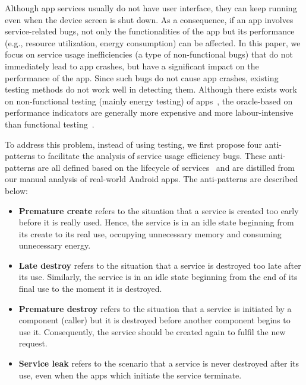 \documentclass[sigconf,review, anonymous]{acmart}
\begin{document}
Although app services usually do not have user interface, they can keep running
even when the device screen is shut down. As a consequence, if an app involves
service-related bugs, not only the functionalities of the app but its
performance (e.g., resource utilization, energy consumption) can be affected.
In this paper, we focus on service usage inefficiencies (a type of
non-functional bugs) that do not immediately lead to app crashes, but
have a significant impact on the performance of the app.
Since such bugs do not cause app crashes, existing testing methods do
not work well in detecting them. Although there exists work on non-functional
testing (mainly energy testing) of apps~\cite{LiuXC14,BanerjeeC0R14,LiuXCL14,BehrouzSBM16,JabbarvandM17}, the
oracle-based on performance indicators are generally more expensive and more
labour-intensive than functional testing~\cite{BehrouzSBM16}.


To address this problem, instead of using testing, we first propose four
anti-patterns to facilitate the analysis of service usage
efficiency bugs. These anti-patterns are all defined based on the lifecycle
of services~\cite{Androidservice} and are distilled from our manual analysis
of real-world Android apps. The anti-patterns are described below:
\begin{itemize}
  \item {\bf Premature create} refers to the situation that a
service is created too early before it is really used. Hence, the service is in
an idle state beginning from its create to its real use, occupying unnecessary
memory and consuming unnecessary energy.
\item  {\bf Late destroy} refers to the situation
that a service is destroyed too late after its use. Similarly, the service is in
an idle state beginning from the end of its final use to the moment it is destroyed.
\item {\bf Premature destroy} refers to the situation that a service is initiated by a
component (caller) but it is destroyed before another component begins to use
it. Consequently, the service should be created again to fulfil the new request.
\item {\bf Service leak} refers to the scenario that a service is never destroyed
after its use, even when the apps which initiate the service terminate.
\end{itemize}
\end{document}
